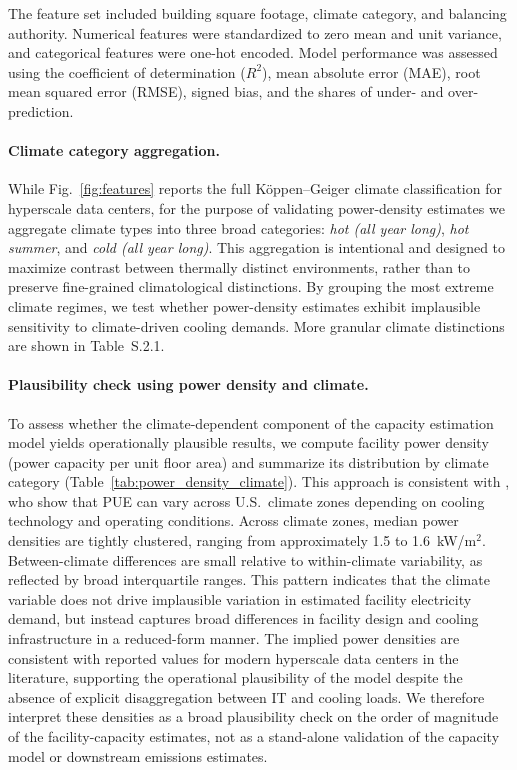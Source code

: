 \documentclass[12pt]{article}
\begin{document}
The feature set included building square footage, climate category, and balancing authority. Numerical features were standardized to zero mean and unit variance, and categorical features were one-hot encoded. Model performance was assessed using the coefficient of determination ($R^2$), mean absolute error (MAE), root mean squared error (RMSE), signed bias, and the shares of under- and over-prediction.

\paragraph{Climate category aggregation.}
While Fig.~\ref{fig:features} reports the full Köppen–Geiger climate classification for hyperscale data centers, for the purpose of validating power-density estimates we aggregate 
climate types into three broad categories: \emph{hot (all year long)}, \emph{hot summer}, and \emph{cold (all year long)}. This aggregation is intentional and designed to maximize 
contrast between thermally distinct environments, rather than to preserve fine-grained climatological distinctions. By grouping the most extreme climate regimes, we test whether 
power-density estimates exhibit implausible sensitivity to climate-driven cooling demands. More granular climate distinctions are shown in Table~S.2.1.

\paragraph{Plausibility check using power density and climate.}To assess whether the climate-dependent component of the capacity estimation model yields operationally plausible results, we compute facility power density (power capacity per unit floor area) and summarize its distribution by climate category (Table~\ref{tab:power_density_climate}). This approach is consistent with \cite{lei2022climatepue}, who show that PUE can vary across U.S.\ climate zones depending on cooling technology and operating conditions. Across climate zones, median power densities are tightly clustered, ranging from approximately 1.5 to 1.6~kW/m$^{2}$. Between-climate differences are small relative to within-climate variability, as reflected by broad interquartile ranges.
This pattern indicates that the climate variable does not drive implausible variation in estimated facility electricity demand, but instead captures broad differences in facility design and cooling infrastructure in a reduced-form manner. The implied power densities are consistent with reported values for modern hyperscale data centers in the literature, supporting the operational plausibility of the model despite the absence of explicit disaggregation between IT and cooling loads.
We therefore interpret these densities as a broad plausibility check on the order of magnitude of the facility-capacity estimates, not as a stand-alone validation of the capacity model or downstream emissions estimates.
\end{document}
